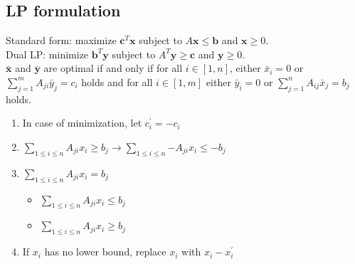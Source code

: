 \subsection{LP formulation}
Standard form: maximize $\mathbf{c}^T\mathbf{x}$ subject to $A\mathbf{x} \leq \mathbf{b}$ and $\mathbf{x} \geq 0$. \\
Dual LP: minimize $\mathbf{b}^T\mathbf{y}$ subject to $A^T\mathbf{y} \geq \mathbf{c}$ and $\mathbf{y} \geq 0$. \\
$\bar{\mathbf{x}}$ and $\bar{\mathbf{y}}$ are optimal if and only if for all $i \in [1, n]$, either $\bar{x}_i = 0$ or $\sum_{j=1}^{m}A_{ji}\bar{y}_j = c_i$ holds and for all $i \in [1, m]$ either $\bar{y}_i = 0$ or $\sum_{j=1}^{n}A_{ij}\bar{x}_j = b_j$ holds.
\begin{enumerate}
    \itemsep-0.5em
    \item In case of minimization, let $c^\prime_i = -c_i$
    \item $\sum_{1 \leq i \leq n}{A_{ji}x_i} \geq b_j \rightarrow \sum_{1 \leq i \leq n}{-A_{ji}x_i} \leq -b_j$
    \item $\sum_{1 \leq i \leq n}{A_{ji}x_i} = b_j$ 
        \vspace{-0.5em}
        \begin{itemize}
            \itemsep-0.5em
            \item $\sum_{1 \leq i \leq n}{A_{ji}x_i} \leq b_j$
            \item $\sum_{1 \leq i \leq n}{A_{ji}x_i} \geq b_j$
        \end{itemize}
    \item If $x_i$ has no lower bound, replace $x_i$ with $x_i - x_i^\prime$
\end{enumerate}





